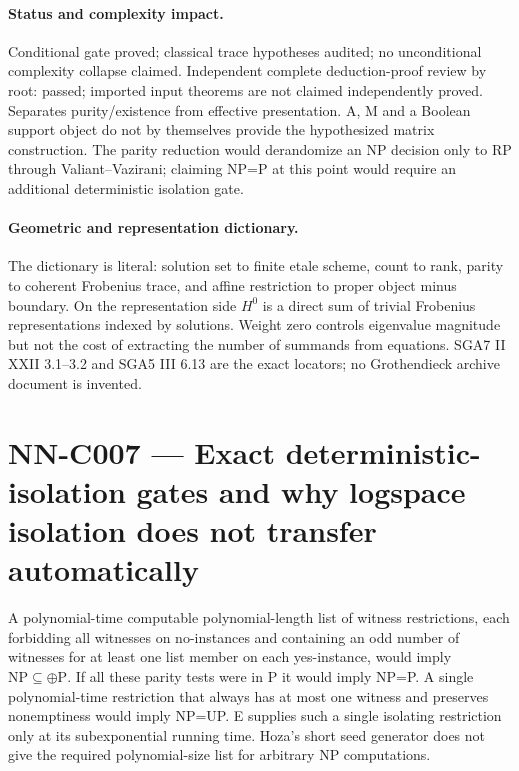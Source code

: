 \paragraph{Status and complexity impact.}
Conditional gate proved; classical trace hypotheses audited; no unconditional complexity collapse claimed. Independent complete deduction-proof review by root: passed; imported input theorems are not claimed independently proved. Separates purity/existence from effective presentation. A, M and a Boolean support object do not by themselves provide the hypothesized matrix construction. The parity reduction would derandomize an NP decision only to RP through Valiant--Vazirani; claiming NP=P at this point would require an additional deterministic isolation gate.

\paragraph{Geometric and representation dictionary.}
The dictionary is literal: solution set to finite etale scheme, count to rank, parity to coherent Frobenius trace, and affine restriction to proper object minus boundary. On the representation side $H^0$ is a direct sum of trivial Frobenius representations indexed by solutions. Weight zero controls eigenvalue magnitude but not the cost of extracting the number of summands from equations. SGA7 II XXII 3.1--3.2 and SGA5 III 6.13 are the exact locators; no Grothendieck archive document is invented.



\section{NN-C007 --- Exact deterministic-isolation gates and why logspace isolation does not transfer automatically}
\begin{proposition}[NN-C007]
A polynomial-time computable polynomial-length list of witness restrictions, each forbidding all witnesses on no-instances and containing an odd number of witnesses for at least one list member on each yes-instance, would imply $\mathrm{NP}\subseteq\oplus\mathrm P$. If all these parity tests were in P it would imply NP=P. A single polynomial-time restriction that always has at most one witness and preserves nonemptiness would imply NP=UP. E supplies such a single isolating restriction only at its subexponential running time. Hoza's short seed generator does not give the required polynomial-size list for arbitrary NP computations.
\end{proposition}
